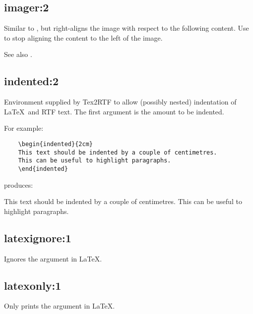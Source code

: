 \subsection*{imager:2}\label{imager}

Similar to , but right-aligns the image with respect to the following
content. Use  to stop aligning the content to the left of the image.

See also .

\subsection*{indented:2}\label{indented}

Environment supplied by Tex2RTF to allow (possibly nested) indentation of
\LaTeX\ and RTF text. The first argument is the amount to be indented.

For example:

\begin{verbatim}
    \begin{indented}{2cm}
    This text should be indented by a couple of centimetres.
    This can be useful to highlight paragraphs.
    \end{indented}
\end{verbatim}

produces:

\begin{indented}{2cm}
This text should be indented by a couple of centimetres. This can be
useful to highlight paragraphs.
\end{indented}

\subsection*{latexignore:1}\label{latexignore}

Ignores the argument in \LaTeX.

\subsection*{latexonly:1}\label{latexonly}

Only prints the argument in \LaTeX.


